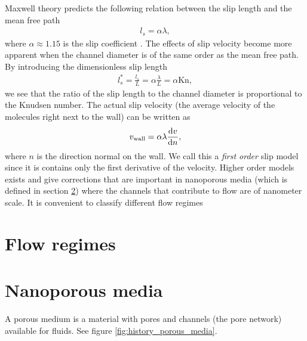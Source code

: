 Maxwell theory predicts the following relation between the slip length and the mean free path
\begin{align}
	\label{eq:noslip_sliplength}
	l_s = \alpha \lambda,
\end{align}
where $\alpha\approx 1.15$ is the slip coefficient \cite{morris1992slip}. The effects of slip velocity become more apparent when the channel diameter is of the same order as the mean free path. By introducing the dimensionless slip length
\begin{align}
	l_s^* = \frac{l_s}{ L} = \alpha \frac{\lambda }{ L} = \alpha \text{Kn},
\end{align}
we see that the ratio of the slip length to the channel diameter is proportional to the Knudsen number. The actual slip velocity (the average velocity of the molecules right next to the wall) can be written as
\begin{align}
	\label{eq:linear_slip_velocity}
	v_{\text{wall}} = \alpha\lambda\frac{\mathrm{d}v}{\mathrm{d}n},
\end{align}
where $n$ is the direction normal on the wall\cite{klinkenberg1941permeability}. We call this a \textit{first order} slip model since it is contains only the first derivative of the velocity. Higher order models exists and give corrections that are important in nanoporous media (which is defined in section \ref{sec:nanoporous_media}) where the channels that contribute to flow are of nanometer scale. It is convenient to classify different flow regimes 
\section{Flow regimes}
\section{Nanoporous media}
\label{sec:nanoporous_media}
A porous medium is a material with pores and channels (the pore network) available for fluids. See figure \ref{fig:history_porous_media}. 

